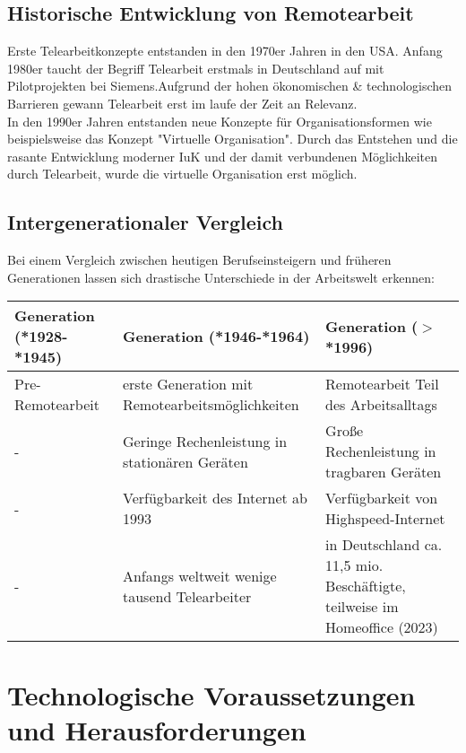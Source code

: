 \documentclass[runningheads]{llncs}
\begin{document}
\subsection{Historische Entwicklung von Remotearbeit}
Erste Telearbeitkonzepte entstanden in den 1970er Jahren in den USA\cite{Dangelmaier.1999}. Anfang 1980er taucht der Begriff Telearbeit erstmals in Deutschland auf mit Pilot\-projekten bei Siemens\cite{Dangelmaier.1999}.Aufgrund der hohen ökonomischen \& technologischen Barrieren gewann Telearbeit erst im laufe der Zeit an Relevanz\cite{Dangelmaier.1999}.\\
In den 1990er Jahren entstanden neue Konzepte für Organisationsformen wie beispielsweise das Konzept "Virtuelle Organisation"\cite{Siedenbiedel.2020}. Durch das Entstehen und die rasante Entwicklung moderner IuK und der damit verbundenen Möglichkeiten durch Telearbeit, wurde die virtuelle Organisation erst möglich\cite{Siedenbiedel.2020}.

\subsection{Intergenerationaler Vergleich}
Bei einem Vergleich zwischen heutigen Berufseinsteigern und früheren Generationen lassen sich drastische Unterschiede in der Arbeitswelt erkennen:
\vspace{-\baselineskip}
\begin{center}
\begin{tabular}{ | m{13em} | m{13em}| m{13em} | } 
\hline
Generation (*1928-*1945) & Generation (*1946-*1964) & Generation ($>$*1996) \\
\hline
Pre-Remotearbeit & erste Generation mit Remotearbeitsmöglichkeiten & Remotearbeit Teil des Arbeits\-alltags\\
\hline
- & Geringe Rechenleistung in stationären Geräten & Große Rechenleistung in tragbaren Geräten\\
\hline
- & Verfügbarkeit des Internet ab 1993\cite{CERN} & Verfügbarkeit von Highspeed-Internet\\
\hline
- & Anfangs weltweit wenige tausend Telearbeiter\cite{heilmann1983softwareentwicklung} & in Deutschland ca. 11,5 mio. Beschäftigte, teilweise im Homeoffice (2023)\cite{statis24, ifo23}\\
\hline
\end{tabular}
\end{center}

\section{Technologische Voraussetzungen und Herausforderungen}
\end{document}
